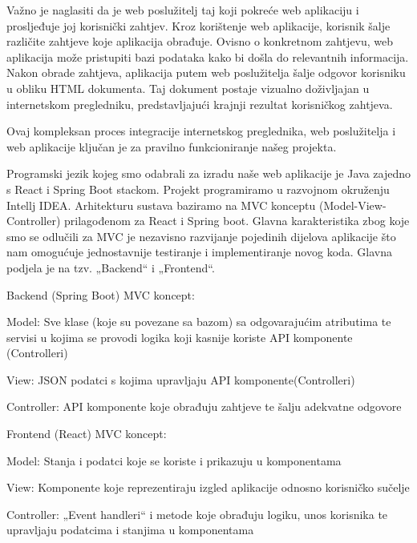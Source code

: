 	Važno je naglasiti da je web poslužitelj taj koji pokreće web aplikaciju i prosljeđuje joj korisnički zahtjev. Kroz korištenje web aplikacije, korisnik šalje različite zahtjeve koje aplikacija obrađuje. Ovisno o konkretnom zahtjevu, web aplikacija može pristupiti bazi podataka kako bi došla do relevantnih informacija. Nakon obrade zahtjeva, aplikacija putem web poslužitelja šalje odgovor korisniku u obliku HTML dokumenta. Taj dokument postaje vizualno doživljajan u internetskom pregledniku, predstavljajući krajnji rezultat korisničkog zahtjeva.

	Ovaj kompleksan proces integracije internetskog preglednika, web poslužitelja i web aplikacije ključan je za pravilno funkcioniranje našeg projekta. 
	
	Programski jezik kojeg smo odabrali za izradu naše web aplikacije je Java zajedno s React i Spring Boot stackom. Projekt programiramo u razvojnom okruženju Intellj IDEA. Arhitekturu sustava baziramo na MVC konceptu (Model-View-Controller) prilagođenom za React i Spring boot. Glavna karakteristika zbog koje smo se odlučili za MVC je nezavisno razvijanje pojedinih dijelova aplikacije što nam omogućuje jednostavnije testiranje i implementiranje novog koda. Glavna podjela je na tzv. „Backend“ i „Frontend“.
	\vspace{30pt}
	
	
	Backend (Spring Boot) MVC koncept:
	
	\begin{packed_enum}
	
		\item Model: Sve klase (koje su povezane sa bazom) sa odgovarajućim atributima te servisi u kojima se provodi logika koji kasnije koriste API komponente (Controlleri)
		\item View: JSON podatci s kojima upravljaju API komponente(Controlleri)
		\item Controller: API komponente koje obrađuju zahtjeve te šalju adekvatne odgovore
							
	\end{packed_enum}
	\eject
	
	Frontend (React) MVC koncept:
	
	\begin{packed_enum}
	
		\item Model: Stanja i podatci koje se koriste i prikazuju u komponentama
		\item View: Komponente koje reprezentiraju izgled aplikacije odnosno korisničko sučelje
		\item Controller: „Event handleri“ i metode koje obrađuju logiku, unos korisnika te upravljaju podatcima i stanjima u komponentama 
							
	\end{packed_enum}
		

